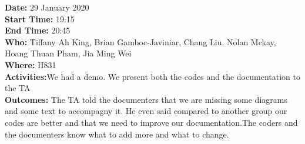 \documentclass[12pt]{article}
\begin{document}
{\bf Date:} 29 January 2020\\
{\bf Start Time:} 19:15\\
{\bf End Time:} 20:45\\
{\bf Who:} Tiffany Ah King, Brian Gamboc-Javiniar,
Chang Liu, Nolan Mckay, Hoang Thuan Pham, Jia Ming Wei\\
{\bf Where:} H831\\
{\bf Activities:}We  had a demo. We present both the codes and the documentation to the TA\\
{\bf Outcomes:} The TA told the documenters that we are missing some diagrams and some text to accompagny it. He even said compared to another group our codes are better and that we need to improve our documentation.The coders and the documenters know what to add more and what to change.\\



\end{document}
